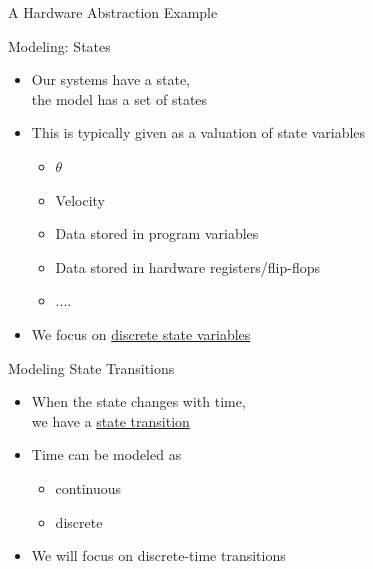 \documentclass{beamer}
\begin{document}
\begin{frame}{A Hardware Abstraction Example}
\end{frame}

\begin{frame}{Modeling: States}
\begin{itemize}
\item<1-> Our systems have a state, \\
the model has a set of states

\item<2-> This is typically given as a valuation of state variables
\begin{itemize}
\item $\theta$
\item Velocity
\item Data stored in program variables
\item Data stored in hardware registers/flip-flops
\item ....
\end{itemize}

\item<3-> We focus on \underline{discrete state variables}
\end{itemize}
\end{frame}

\begin{frame}{Modeling State Transitions}
\begin{itemize}
\item<1-> When the state changes with time, \\
we have a \underline{state transition}

\item<2-> Time can be modeled as
 \begin{itemize}
\item continuous
\item discrete
\end{itemize}

\item<3-> We will focus on discrete-time transitions
\end{itemize}
\end{frame}
\end{document}
